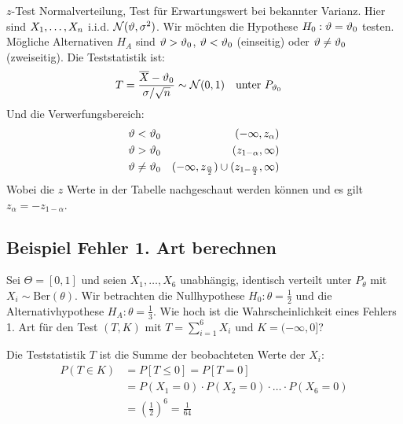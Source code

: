 \begin{definition}{$z$-Test}
  \color{red}Normalverteilung, Test für Erwartungswert bei bekannter Varianz. \color{black} Hier sind
  $X_1, \dots, X_n$ i.i.d. $\mathcal{N} (\vartheta, \sigma^2)$. Wir möchten die
  Hypothese $H_0 : \vartheta = \vartheta_0$ testen. Mögliche Alternativen $H_A$ sind $\vartheta >
    \vartheta_0$, $\vartheta < \vartheta_0$ (einseitig) oder $\vartheta \neq \vartheta_0$ (zweiseitig). Die
  Teststatistik ist:
  \begin{align*}
    T & = \frac{\overline{X} - \vartheta_0}{\sigma / \sqrt{n}} \sim \mathcal{N} (0, 1)
      &                                                                               & \text{unter } P_{\vartheta_0}
  \end{align*}
  Und die Verwerfungsbereich:
  \begin{align*}
    \vartheta < \vartheta_0    &  & (-\infty, z_\alpha)                                                      \\
    \vartheta > \vartheta_0    &  & (z_{1 - \alpha}, \infty)                                                 \\
    \vartheta \neq \vartheta_0 &  & (-\infty, z_{\frac{\alpha}{2}}) \cup  (z_{1 - \frac{\alpha}{2}}, \infty)
  \end{align*}
  Wobei die $z$ Werte in der Tabelle nachgeschaut werden können
  und es gilt $z_\alpha = - z_{1 - \alpha}$.
\end{definition}
\BoxStart{}
\subsection{Beispiel Fehler 1. Art berechnen}
Sei $\Theta = [0, 1]$ und seien $X_1, \ldots , X_6$ unabhängig, identisch verteilt unter $P_\theta$
mit $X_i \sim \text{Ber}(\theta)$. Wir betrachten die Nullhypothese $H_0 : \theta = \frac{1}{2}$ und die Alternativhypothese
$H_A : \theta = \frac{1}{3}$. Wie hoch ist die Wahrscheinlichkeit eines Fehlers 1. Art für den Test $(T, K)$ mit
$T = \sum_{i=1}^{6} X_i$ und $K = (-\infty, 0]$?

Die Teststatistik $T$ ist die Summe der beobachteten Werte der $X_i$:
\begin{align*}
  P(T \in K) & = P[T \leq 0] = P[T = 0]                                    \\
             & = P(X_1 = 0) \cdot P(X_2 = 0) \cdot \ldots \cdot P(X_6 = 0) \\
             & = \left( \frac{1}{2} \right)^6 = \frac{1}{64}
\end{align*}



